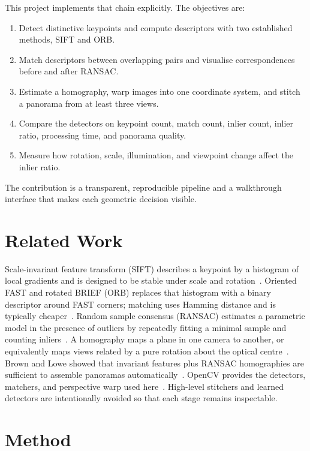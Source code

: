\documentclass[10pt,twocolumn,letterpaper]{article}
\begin{document}
This project implements that chain explicitly. The objectives are:
\begin{enumerate}
\item Detect distinctive keypoints and compute descriptors with two established methods, SIFT and ORB.
\item Match descriptors between overlapping pairs and visualise correspondences before and after RANSAC.
\item Estimate a homography, warp images into one coordinate system, and stitch a panorama from at least three views.
\item Compare the detectors on keypoint count, match count, inlier count, inlier ratio, processing time, and panorama quality.
\item Measure how rotation, scale, illumination, and viewpoint change affect the inlier ratio.
\end{enumerate}

The contribution is a transparent, reproducible pipeline and a walkthrough interface that makes each geometric decision visible.

\section{Related Work}

Scale-invariant feature transform (SIFT) describes a keypoint by a histogram of local gradients and is designed to be stable under scale and rotation~\cite{lowe2004sift}. Oriented FAST and rotated BRIEF (ORB) replaces that histogram with a binary descriptor around FAST corners; matching uses Hamming distance and is typically cheaper~\cite{rublee2011orb}. Random sample consensus (RANSAC) estimates a parametric model in the presence of outliers by repeatedly fitting a minimal sample and counting inliers~\cite{fischler1981ransac}. A homography maps a plane in one camera to another, or equivalently maps views related by a pure rotation about the optical centre~\cite{hartley2003mvg}. Brown and Lowe showed that invariant features plus RANSAC homographies are sufficient to assemble panoramas automatically~\cite{brown2007panorama}. OpenCV provides the detectors, matchers, and perspective warp used here~\cite{bradski2000opencv}. High-level stitchers and learned detectors are intentionally avoided so that each stage remains inspectable.

\section{Method}
\end{document}
